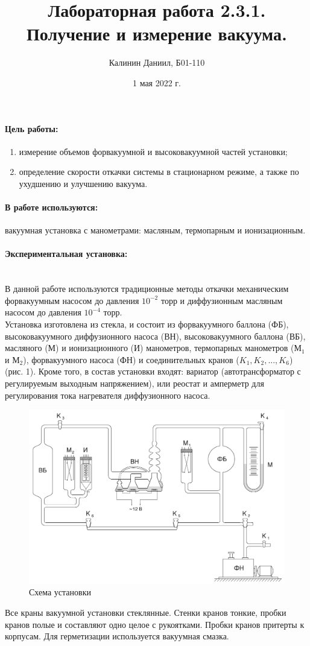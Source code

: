 \documentclass[a4paper, 12pt]{article}
\author{Калинин Даниил, Б01-110}
\date{1 мая 2022 г.}
\title{Лабораторная работа 2.3.1. Получение и измерение вакуума.}
\newcommand{\parag}[1]{\paragraph*{#1:}}
\begin{document}
\maketitle

\parag {Цель работы}
\begin{enumerate}
    \item измерение объемов форвакуумной и высоковакуумной частей установки;
    \item определение скорости откачки системы в стационарном режиме, а также по ухудшению и улучшению вакуума. 
\end{enumerate}

\parag {В работе используются}
вакуумная установка с манометрами: масляным, термопарным и ионизационным.

\parag {Экспериментальная установка}~\\
В данной работе используются традиционные методы откачки механическим форвакуумным насосом до давления $10^{-2}$ торр и диффузионным масляным насосом до давления $10^{-4}$ торр. \\
Установка изготовлена из стекла,
и состоит из форвакуумного баллона (ФБ), высоковакуумного диффузионного насоса (ВН), высоковакуумного баллона (ВБ), масляного (М) и ионизационного (И) манометров, термопарных манометров ($\text{М}_1$ и $\text{М}_2$), форвакуумного насоса (ФН) и соединительных кранов ($K_1, K_2,..., K_6$) (рис. 1). Кроме того, в состав установки входят: вариатор
(автотрансформатор с регулируемым выходным напряжением), или
реостат и амперметр для регулирования тока нагревателя диффузионного насоса. \\
\begin{figure}[!h]
\centering
\includegraphics[width=0.5\linewidth]{setup.png}
\caption[]{Схема установки}
\label{fig:Схема установки}
\end{figure}
Все краны вакуумной установки стеклянные. Стенки кранов тонкие, пробки кранов полые и составляют одно целое с рукоятками. Пробки кранов притерты к корпусам. Для герметизации используется вакуумная смазка. \\
\end{document}
